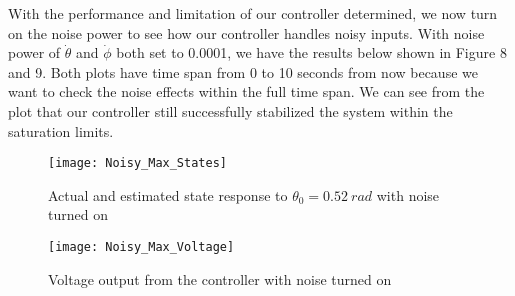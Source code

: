 \documentclass{article}
\begin{document}
With the performance and limitation of our controller determined, we now turn on the noise power to see how our controller handles noisy inputs. With noise power of $\dot{\theta}$ and $\dot{\phi}$ both set to 0.0001, we have the results below shown in Figure 8 and 9. Both plots have time span from 0 to 10 seconds from now because we want to check the noise effects within the full time span. We can see from the plot that our controller still successfully stabilized the system within the saturation limits. 
\begin{figure}[h!]
\texttt{[image: Noisy\_Max\_States]}
\centering
\caption{Actual and estimated state response to $\theta_0=0.52\ rad$ with noise turned on}
\end{figure}
\begin{figure}[h!]
\texttt{[image: Noisy\_Max\_Voltage]}
\centering
\caption{Voltage output from the controller with noise turned on}
\end{figure}
\end{document}
